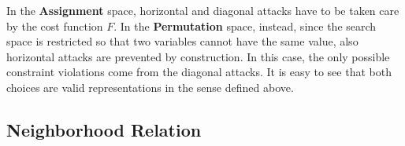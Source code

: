 \begin{figure}
  \subfigures 
  \begin{minipage}{\textwidth}
    \hspace{\fill}
  \end{minipage}
\end{figure}

In the \textbf{Assignment} space, horizontal and diagonal attacks have
to be taken care by the cost function $F$. In the \textbf{Permutation}
space, instead, since the search space is restricted so that two variables
cannot have the same value, also horizontal attacks are prevented by construction. In
this case, the only possible constraint violations come from the
diagonal attacks. It is easy to see that both choices are valid representations in the
sense defined above.

\subsection{Neighborhood Relation}

